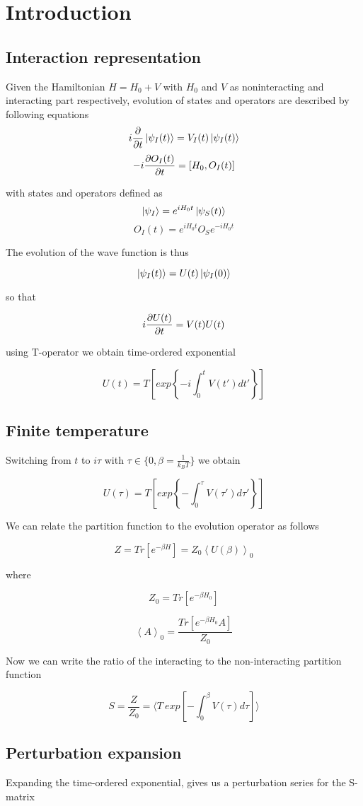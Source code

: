 \section{Introduction}
\subsection{Interaction representation}

Given the Hamiltonian $H=H_0+V$ with $H_0$ and $V$ as noninteracting and interacting part respectively,
evolution of states and operators are described by following equations
\[ i\frac{\partial }{\partial t}\ket{\psi_I(t)}=V_I(t)\ket{\psi_I(t)} \]
\[ -i\frac{\partial O_I(t)}{\partial t}=\left[H_0,O_I(t)\right] \]

with states and operators defined as
\[ \ket{\psi_I} = e^{i H_0 t}\ket{\psi_S(t)} \]
\[ O_I(t) = e^{i H_0 t} O_S e^{-i H_0 t} \] 

The evolution of the wave function is thus

\[ \ket{\psi_I(t)} = U(t) \ket{\psi_I(0)} \]

so that

\[ i\frac{\partial U(t)}{\partial t} = V(t) U(t) \]

using T-operator we obtain time-ordered exponential

\[ U(t) = T\left[exp\left\{-i\int_{0}^{t}V(t')dt'\right\}\right] \]

\subsection{Finite temperature}
Switching from $t$ to $i\tau$ with $\tau\in\{0,\beta=\frac{1}{k_B T}\}$ we obtain

\[ U(\tau) = T\left[exp\left\{-\int_{0}^{\tau}V(\tau')d\tau'\right\}\right] \]

We can relate the partition function to the evolution operator as follows

\[ Z = Tr\left[e^{-\beta H}\right] = Z_0\left<U(\beta)\right>_0 \]

where 

\[ Z_0 = Tr\left[e^{-\beta H_0}\right] \]

\[ \left<A\right>_0 = \frac{Tr\left[e^{-\beta H_0}A\right]}{Z_0} \]

Now we can write the ratio of the interacting to the non-interacting partition function

\[ S = \frac{Z}{Z_0} = \langle T\ exp\left[-\int_{0}^{\beta}V(\tau)d\tau\right]\rangle \]

\subsection{Perturbation expansion}
Expanding the time-ordered exponential, gives us a perturbation series for the S-matrix

